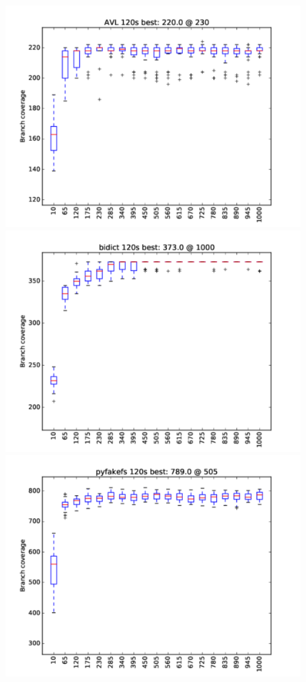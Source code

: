 \documentclass[sigplan,screen]{acmart}
\begin{document}
\begin{figure}
\vspace{2mm}
  \includegraphics[width=0.9\columnwidth]{graphs/AVLrand120}
  \includegraphics[width=0.9\columnwidth]{graphs/bidictrand120}
\includegraphics[width=0.9\columnwidth]{graphs/pyfakefsrand120}

\end{figure}
\end{document}
